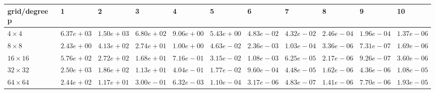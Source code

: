 \begin{tabular}{lllllllllll}
\hline
 grid/degree p   & 1          & 2          & 3          & 4          & 5          & 6          & 7          & 8          & 9          & 10         \\
\hline
 $4 \times 4$    & $6.37e+03$ & $1.50e+03$ & $6.80e+02$ & $9.06e+00$ & $5.43e+00$ & $4.83e-02$ & $4.32e-02$ & $2.46e-04$ & $1.96e-04$ & $1.37e-06$ \\
 $8 \times 8$    & $2.43e+00$ & $4.13e+02$ & $2.74e+01$ & $1.00e+00$ & $4.63e-02$ & $2.36e-03$ & $1.03e-04$ & $3.36e-06$ & $7.31e-07$ & $1.69e-06$ \\
 $16 \times 16$  & $5.76e+02$ & $2.72e+02$ & $1.68e+01$ & $7.16e-01$ & $3.15e-02$ & $1.08e-03$ & $6.25e-05$ & $2.17e-06$ & $9.26e-07$ & $3.60e-06$ \\
 $32 \times 32$  & $2.50e+03$ & $1.86e+02$ & $1.13e+01$ & $4.04e-01$ & $1.77e-02$ & $9.60e-04$ & $4.48e-05$ & $1.62e-06$ & $4.36e-06$ & $1.08e-05$ \\
 $64 \times 64$  & $2.44e+02$ & $1.17e+01$ & $3.00e-01$ & $6.32e-03$ & $1.10e-04$ & $3.17e-06$ & $4.83e-07$ & $1.41e-06$ & $7.70e-06$ & $1.93e-05$ \\
\hline
\end{tabular}